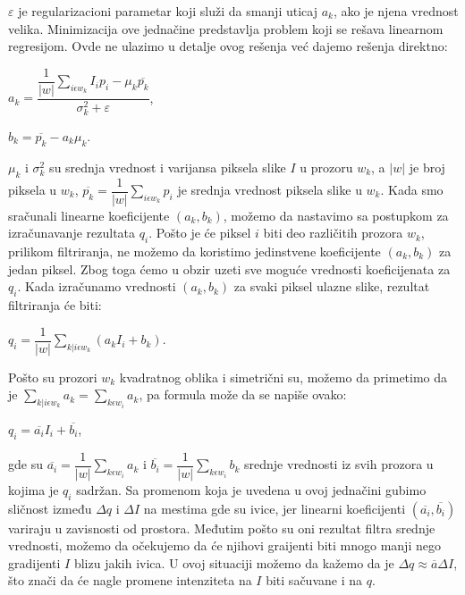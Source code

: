 \documentclass[a4paper,12pt,titlepage]{article}
\begin{document}
$\varepsilon$ je regularizacioni parametar koji služi da smanji uticaj $a_k$, ako je njena vrednost velika. Minimizacija ove jednačine predstavlja problem koji se rešava linearnom regresijom. Ovde ne ulazimo u detalje ovog rešenja već dajemo rešenja direktno:

\begin{center}
	$a_k = \dfrac{\dfrac{1}{|w|} \sum_{i \epsilon w_k} I_ip_i - \mu_k \overline{p_k}}{\sigma_k^2 + \varepsilon}$,
\end{center}

\begin{center}
	$b_k = \overline{p_k} - a_k \mu_k$.
\end{center}

$\mu_k$ i $\sigma_k^2$ su srednja vrednost i varijansa piksela slike $I$ u prozoru $w_k$, a $|w|$ je broj piksela u $w_k$, $\overline{p_k} = \dfrac{1}{|w|} \sum_{i \epsilon w_k} p_i$ je srednja vrednost piksela slike u $w_k$. Kada smo sračunali linearne koeficijente $(a_k, b_k)$, možemo da nastavimo sa postupkom za izračunavanje rezultata $q_i$. Pošto je će piksel $i$ biti deo različitih prozora $w_k$, prilikom filtriranja, ne možemo da koristimo jedinstvene koeficijente $(a_k, b_k)$ za jedan piksel. Zbog toga ćemo u obzir uzeti sve moguće vrednosti koeficijenata za $q_i$. Kada izračunamo vrednosti $(a_k, b_k)$ za svaki piksel ulazne slike, rezultat filtriranja će biti:

\begin{center}
	$q_i = \dfrac{1}{|w|} \sum_{k|i \epsilon w_k} (a_kI_i + b_k)$.
\end{center}    

Pošto su prozori $w_k$ kvadratnog oblika i simetrični su, možemo da primetimo da je $\sum_{k|i \epsilon w_k} a_k = \sum_{k \epsilon w_i} a_k$, pa formula može da se napiše ovako:

\begin{center}
	$q_i = \overline{a_i}I_i + \overline{b_i}$,
\end{center}

gde su $\overline{a_i} = \dfrac{1}{|w|}\sum_{k \epsilon w_i} a_k$ i $\overline{b_i} = \dfrac{1}{|w|}\sum_{k \epsilon w_i} b_k$ srednje vrednosti iz svih prozora u kojima je $q_i$ sadržan. Sa promenom koja je uvedena u ovoj jednačini gubimo sličnost između $\Delta q$ i $\Delta I$ na mestima gde su ivice, jer linearni koeficijenti $(\overline{a_i}, \overline{b_i})$ variraju u zavisnosti od prostora. Međutim pošto su oni rezultat filtra srednje vrednosti, možemo da očekujemo da će njihovi graijenti biti mnogo manji nego gradijenti $I$ blizu jakih ivica. U ovoj situaciji možemo da kažemo da je $\Delta q \approx \overline{a} \Delta I$, što znači da će nagle promene intenziteta na $I$ biti sačuvane i na $q$. 
\end{document}
